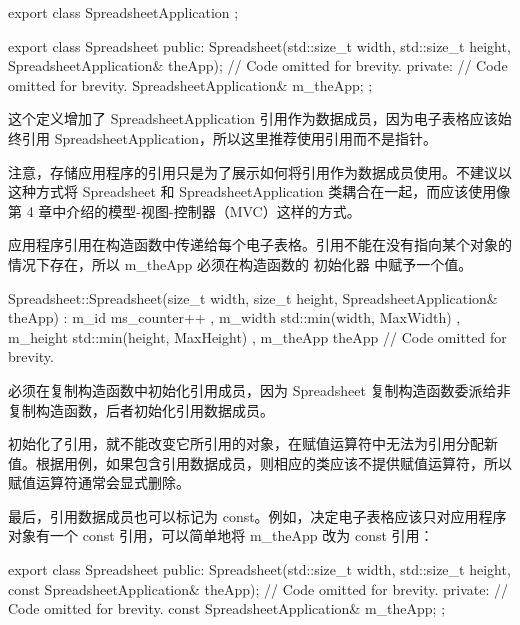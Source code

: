 \begin{cpp}
export class SpreadsheetApplication { };

export class Spreadsheet
{
    public:
        Spreadsheet(std::size_t width, std::size_t height,
            SpreadsheetApplication& theApp);
        // Code omitted for brevity.
    private:
        // Code omitted for brevity.
        SpreadsheetApplication& m_theApp;
};
\end{cpp}

这个定义增加了 SpreadsheetApplication 引用作为数据成员，因为电子表格应该始终引用 SpreadsheetApplication，所以这里推荐使用引用而不是指针。

注意，存储应用程序的引用只是为了展示如何将引用作为数据成员使用。不建议以这种方式将 Spreadsheet 和 SpreadsheetApplication 类耦合在一起，而应该使用像第 4 章中介绍的模型-视图-控制器（MVC）这样的方式。

应用程序引用在构造函数中传递给每个电子表格。引用不能在没有指向某个对象的情况下存在，所以 m\_theApp 必须在构造函数的 初始化器 中赋予一个值。

\begin{cpp}
Spreadsheet::Spreadsheet(size_t width, size_t height,
    SpreadsheetApplication& theApp)
    : m_id { ms_counter++ }
    , m_width { std::min(width, MaxWidth) }
    , m_height { std::min(height, MaxHeight) }
    , m_theApp { theApp }
{
    // Code omitted for brevity.
}
\end{cpp}

必须在复制构造函数中初始化引用成员，因为 Spreadsheet 复制构造函数委派给非复制构造函数，后者初始化引用数据成员。

初始化了引用，就不能改变它所引用的对象，在赋值运算符中无法为引用分配新值。根据用例，如果包含引用数据成员，则相应的类应该不提供赋值运算符，所以赋值运算符通常会显式删除。

最后，引用数据成员也可以标记为 const。例如，决定电子表格应该只对应用程序对象有一个 const 引用，可以简单地将 m\_theApp 改为 const 引用：

\begin{cpp}
export class Spreadsheet
{
    public:
        Spreadsheet(std::size_t width, std::size_t height,
            const SpreadsheetApplication& theApp);
        // Code omitted for brevity.
    private:
        // Code omitted for brevity.
        const SpreadsheetApplication& m_theApp;
};
\end{cpp}



